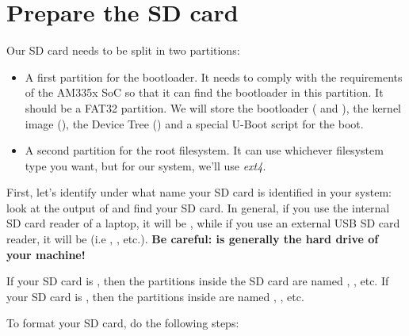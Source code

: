 \section{Prepare the SD card}

Our SD card needs to be split in two partitions:

\begin{itemize}

\item A first partition for the bootloader. It needs to comply with
  the requirements of the AM335x SoC so that it can find the bootloader in
  this partition. It should be a FAT32 partition. We will store the
  bootloader ( and ), the kernel image
  (), the Device Tree () and a
  special U-Boot script for the boot.

\item A second partition for the root filesystem. It can use
  whichever filesystem type you want, but for our system, we'll use
  {\em ext4}.

\end{itemize}

First, let's identify under what name your SD card is identified in
your system: look at the output of  and
find your SD card. In general, if you use the internal SD card reader
of a laptop, it will be , while if you use an external
USB SD card reader, it will be  (i.e , ,
etc.). {\bf Be careful:  is generally the hard drive of
  your machine!}

If your SD card is , then the partitions inside the
SD card are named , , etc. If your SD
card is , then the partitions inside are named
, , etc.

To format your SD card, do the following steps:

